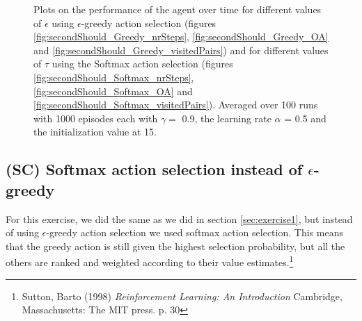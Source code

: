 \documentclass{article}
\begin{document}
\begin{figure}[ht]
{    \label{fig:secondShould_Softmax_OA}
}
\caption{Plots on the performance of the agent over time for different values of $\epsilon$ using $\epsilon$-greedy action selection (figures \ref{fig:secondShould_Greedy_nrSteps}, \ref{fig:secondShould_Greedy_OA} and \ref{fig:secondShould_Greedy_visitedPairs}) and for different values of $\tau$ using the Softmax action selection (figures \ref{fig:secondShould_Softmax_nrSteps}, \ref{fig:secondShould_Softmax_OA} and \ref{fig:secondShould_Softmax_visitedPairs}). Averaged over 100 runs with 1000 episodes each with $\gamma = $ 0.9, the learning rate $\alpha$ = 0.5 and the initialization value at 15.}
\label{plot:secondShould}
\end{figure}


\subsection{(SC) Softmax action selection instead of $\epsilon$-greedy}\label{sec:exercise3}
For this exercise, we did the same as we did in section \ref{sec:exercise1}, but instead of using $\epsilon$-greedy action selection we used softmax action selection. This means that the greedy action is still given the highest selection probability, but all the others are ranked and weighted according to their value estimates.\footnote{Sutton, Barto (1998) \textit{Reinforcement Learning: An Introduction} Cambridge, Massachusetts: The MIT press. p. 30}
\end{document}
